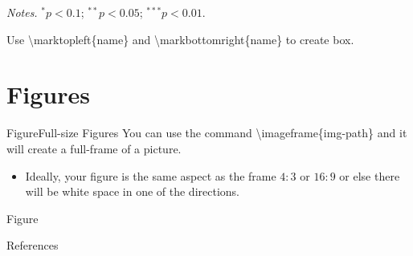 \documentclass[aspectratio=43]{beamer}
\begin{document}
\begin{frame}
\begin{table}[!htbp]
\begin{adjustbox}{max width = \textwidth, width = 0.5\textwidth, center}
\begin{threeparttable}
\begin{tabular}{@{} l *{2}{r} @{}}
            \end{tabular} 
            \begin{tablenotes}
                \item \textit{Notes.} $^{*} p<0.1$; $^{**} p<0.05$; $^{***} p<0.01$.
            \end{tablenotes}
        \end{threeparttable}
    \end{adjustbox}
\end{table}

{\small
Use \textbackslash marktopleft\{name\} and \textbackslash markbottomright\{name\} to create box.
}
\end{frame}

\section{Figures}



\begin{frame}{Figure}{Full-size Figures}
    You can use the command \textbackslash imageframe\{img-path\} and it will create a full-frame of a picture. 
    
    \begin{itemize}
        \item Ideally, your figure is the same aspect as the frame $4:3$ or $16:9$ or else there will be white space in one of the directions.
    \end{itemize}
\end{frame}

\begin{frame}{Figure}{}
    \begin{center}
    \end{center}
\end{frame}

\begin{frame}[allowframebreaks]{References}
    \printbibliography
\end{frame}
\end{document}

